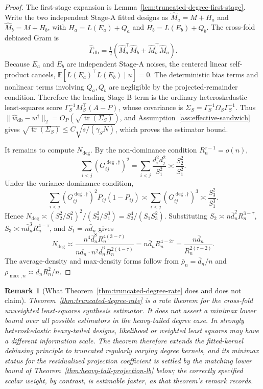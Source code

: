 \documentclass[12pt]{article}
\newtheorem{remark}{Remark}
\newcommand{\1}{\mathbf{1}}
\begin{document}
\begin{proof}
The first-stage expansion is Lemma~\ref{lem:truncated-degree-first-stage}.
Write the two independent Stage-A fitted designs as \(\widehat M_a=M+H_a\) and
\(\widehat M_b=M+H_b\), with \(H_a=L(E_a)+Q_a\) and \(H_b=L(E_b)+Q_b\). The
cross-fold debiased Gram is
\[
    \widehat\Gamma_{\mathrm{db}}
    =
    \tfrac12
    \left(
        \widehat M_a^\top\widehat M_b
        +
        \widehat M_b^\top\widehat M_a
    \right).
\]
Because \(E_a\) and \(E_b\) are independent Stage-A noises, the centered
linear self-product cancels, \(\mathbb E[L(E_a)^\top L(E_b)\mid u]=0\). The
deterministic bias terms and nonlinear terms involving \(Q_a,Q_b\) are
negligible by the projected-remainder condition. Therefore the leading
Stage-B term is the ordinary heteroskedastic least-squares score
\(\Gamma_S^{-1}M_S^\top(A-P)\), whose covariance is
\(\Sigma_S=\Gamma_S^{-1}\Omega_S\Gamma_S^{-1}\). Thus
\(\|\widehat w_{\mathrm{db}}-w^\dagger\|_2=O_P(\sqrt{\operatorname{tr}(\Sigma_S)})\),
and Assumption~\ref{ass:effective-sandwich} gives
\(\sqrt{\operatorname{tr}(\Sigma_S)}\le C\sqrt{s/(\gamma_S N)}\), which
proves the estimator bound.

It remains to compute \(N_{\deg}\). By the non-dominance condition
\(R_n^{\tau-1}=o(n)\),
\[
    \sum_{i<j}(G^{\deg,\dagger}_{ij})^2
    =
    \sum_{i<j}\frac{d_i^2d_j^2}{S_1^2}
    \asymp
    \frac{S_2^2}{S_1^2}.
\]
Under the variance-dominance condition,
\[
    \sum_{i<j}(G^{\deg,\dagger}_{ij})^2P_{ij}(1-P_{ij})
    \asymp
    \sum_{i<j}(G^{\deg,\dagger}_{ij})^3
    \asymp
    \frac{S_3^2}{S_1^3}.
\]
Hence \(N_{\deg}\asymp(S_2^2/S_1^2)^2/(S_3^2/S_1^3)=S_2^4/(S_1S_3^2)\).
Substituting \(S_2\asymp n\bar d_n^2R_n^{3-\tau}\),
\(S_3\asymp n\bar d_n^3R_n^{4-\tau}\), and \(S_1=n\bar d_n\) gives
\[
    N_{\deg}
    \asymp
    \frac{
        n^4\bar d_n^8R_n^{4(3-\tau)}
    }{
        n\bar d_n\cdot n^2\bar d_n^6R_n^{2(4-\tau)}
    }
    =
    n\bar d_n R_n^{4-2\tau}
    =
    \frac{n\bar d_n}{R_n^{2(\tau-2)}}.
\]
The average-density and max-density forms follow from \(\bar\rho_n=\bar d_n/n\)
and \(\rho_{\max,n}\asymp\bar d_nR_n^2/n\).
\end{proof}

\begin{remark}[What Theorem~\ref{thm:truncated-degree-rate} does and does not claim]
Theorem~\ref{thm:truncated-degree-rate} is a rate theorem for the
cross-fold unweighted least-squares synthesis estimator. It does not assert
a minimax lower bound over all possible estimators in the heavy-tailed degree
case. In strongly heteroskedastic heavy-tailed designs, likelihood or
weighted least squares may have a different information scale. The theorem
therefore extends the fitted-kernel debiasing principle to truncated
regularly varying degree kernels, and its minimax status for the residualized projection coefficient is
settled by the matching lower bound of Theorem~\ref{thm:heavy-tail-projection-lb} below; the correctly
specified scalar weight, by contrast, is estimable faster, as that theorem's remark records.
\end{remark}
\end{document}
